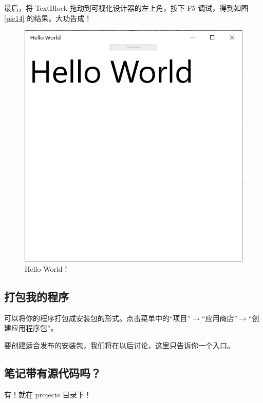 最后，将 TextBlock 拖动到可视化设计器的左上角，按下 F5 调试，得到如图 \ref{pic14} 的结果。大功告成！
\begin{figure}[htbp]
    \centering
    \includegraphics[width = 0.5\paperwidth]{pic/14.png}
    \caption{Hello World！}
\end{figure}

\subsection{打包我的程序}

可以将你的程序打包成安装包的形式。点击菜单中的``项目''$\rightarrow$``应用商店''$\rightarrow$``创建应用程序包''。

要创建适合发布的安装包，我们将在以后讨论，这里只告诉你一个入口。

\subsection{笔记带有源代码吗？}

有！就在 projects 目录下！